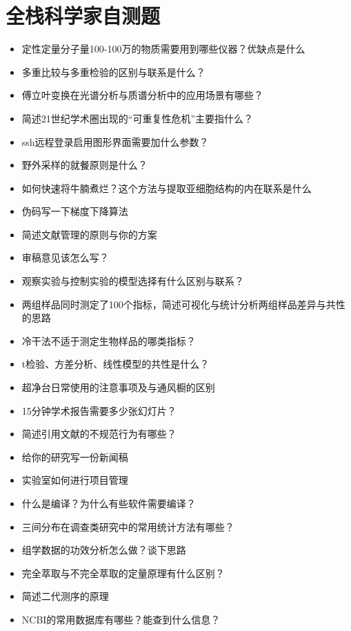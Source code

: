 \documentclass[]{tufte-book}
\begin{document}
\hypertarget{ux5168ux6808ux79d1ux5b66ux5bb6ux81eaux6d4bux9898}{%
\section*{全栈科学家自测题}\label{ux5168ux6808ux79d1ux5b66ux5bb6ux81eaux6d4bux9898}}

\begin{itemize}
\item
  定性定量分子量100-100万的物质需要用到哪些仪器？优缺点是什么
\item
  多重比较与多重检验的区别与联系是什么？
\item
  傅立叶变换在光谱分析与质谱分析中的应用场景有哪些？
\item
  简述21世纪学术圈出现的``可重复性危机''主要指什么？
\item
  ssh远程登录启用图形界面需要加什么参数？
\item
  野外采样的就餐原则是什么？
\item
  如何快速将牛腩煮烂？这个方法与提取亚细胞结构的内在联系是什么
\item
  伪码写一下梯度下降算法
\item
  简述文献管理的原则与你的方案
\item
  审稿意见该怎么写？
\item
  观察实验与控制实验的模型选择有什么区别与联系？
\item
  两组样品同时测定了100个指标，简述可视化与统计分析两组样品差异与共性的思路
\item
  冷干法不适于测定生物样品的哪类指标？
\item
  t检验、方差分析、线性模型的共性是什么？
\item
  超净台日常使用的注意事项及与通风橱的区别
\item
  15分钟学术报告需要多少张幻灯片？
\item
  简述引用文献的不规范行为有哪些？
\item
  给你的研究写一份新闻稿
\item
  实验室如何进行项目管理
\item
  什么是编译？为什么有些软件需要编译？
\item
  三间分布在调查类研究中的常用统计方法有哪些？
\item
  组学数据的功效分析怎么做？谈下思路
\item
  完全萃取与不完全萃取的定量原理有什么区别？
\item
  简述二代测序的原理
\item
  NCBI的常用数据库有哪些？能查到什么信息？

\end{itemize}
\end{document}
